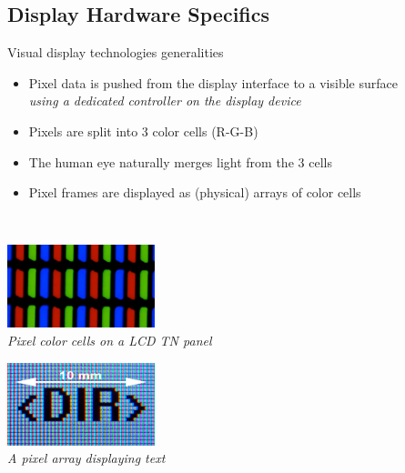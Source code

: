 \subsection{Display Hardware Specifics}

\begin{frame}{Visual display technologies generalities}
  \begin{itemize}
  \item Pixel data is pushed from the display interface to a visible surface\\
  \textit{using a dedicated controller on the display device}
  \item Pixels are split into 3 color cells (R-G-B)
  \item The human eye naturally merges light from the 3 cells
  \item Pixel frames are displayed as (physical) arrays of color cells
  \end{itemize}~

  \begin{minipage}[b]{0.45\textwidth}
    \centering
    \includegraphics[height=6.5em]{slides/graphics-introduction/pixel-array.jpg}\\
    \textit{\small Pixel color cells on a LCD TN panel}
  \end{minipage}
  \hfill
  \begin{minipage}[b]{0.45\textwidth}
    \centering
    \includegraphics[height=6.5em]{slides/graphics-introduction/pixel-array-text.jpg}\\
    \textit{\small A pixel array displaying text}
  \end{minipage}
\end{frame}

